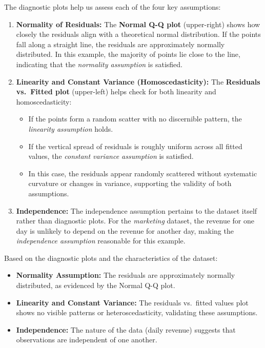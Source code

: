 \documentclass[
]{book}
\providecommand{\tightlist}{%
  \setlength{\itemsep}{0pt}\setlength{\parskip}{0pt}}
\theoremstyle{definition}
\theoremstyle{definition}
\theoremstyle{definition}
\theoremstyle{definition}
\theoremstyle{remark}
\begin{document}
The diagnostic plots help us assess each of the four key assumptions:

\begin{enumerate}
\def\labelenumi{\arabic{enumi}.}
\item
  \textbf{Normality of Residuals:} The \textbf{Normal Q-Q plot} (upper-right) shows how closely the residuals align with a theoretical normal distribution. If the points fall along a straight line, the residuals are approximately normally distributed. In this example, the majority of points lie close to the line, indicating that the \emph{normality assumption} is satisfied.
\item
  \textbf{Linearity and Constant Variance (Homoscedasticity): }The \textbf{Residuals vs.~Fitted plot} (upper-left) helps check for both linearity and homoscedasticity:

  \begin{itemize}
  \tightlist
  \item
    If the points form a random scatter with no discernible pattern, the \emph{linearity assumption} holds.\\
  \item
    If the vertical spread of residuals is roughly uniform across all fitted values, the \emph{constant variance assumption} is satisfied.\\
  \item
    In this case, the residuals appear randomly scattered without systematic curvature or changes in variance, supporting the validity of both assumptions.
  \end{itemize}
\item
  \textbf{Independence:} The independence assumption pertains to the dataset itself rather than diagnostic plots. For the \emph{marketing} dataset, the revenue for one day is unlikely to depend on the revenue for another day, making the \emph{independence assumption} reasonable for this example.
\end{enumerate}

Based on the diagnostic plots and the characteristics of the dataset:

\begin{itemize}
\tightlist
\item
  \textbf{Normality Assumption:} The residuals are approximately normally distributed, as evidenced by the Normal Q-Q plot.\\
\item
  \textbf{Linearity and Constant Variance:} The residuals vs.~fitted values plot shows no visible patterns or heteroscedasticity, validating these assumptions.\\
\item
  \textbf{Independence:} The nature of the data (daily revenue) suggests that observations are independent of one another.
\end{itemize}
\end{document}
